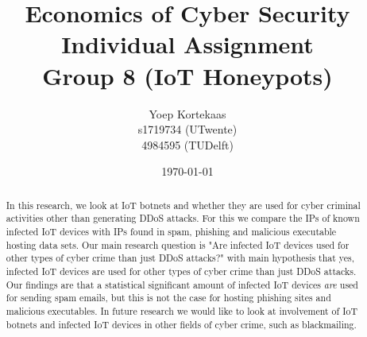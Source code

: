 \documentclass[a4paper,10pt]{article}
\title{Economics of Cyber Security \\
  Individual Assignment  \\
  \large Group 8 (IoT Honeypots)}
\author{
  Yoep Kortekaas \\ 
  s1719734 (UTwente) \\
  4984595 (TUDelft)
}
\date{\today}
\begin{document}
\maketitle

\begin{abstract}
In this research, we look at IoT botnets and whether they are used for cyber criminal activities other than generating DDoS attacks. 
For this we compare the IPs of  known infected IoT devices with IPs found in spam, phishing and malicious executable hosting data 
sets. Our main research question is "Are infected IoT devices used for other types of cyber crime than just DDoS attacks?" with main 
hypothesis that yes, infected IoT devices are used for other types of cyber crime than just DDoS attacks. Our findings are that a 
statistical significant amount of infected IoT devices \textit{are} used for sending spam emails, but this is not the case for hosting 
phishing sites and malicious executables. In future research we would like to look at involvement of IoT botnets and infected IoT 
devices in other fields of cyber crime, such as blackmailing.
\end{abstract}
\end{document}
